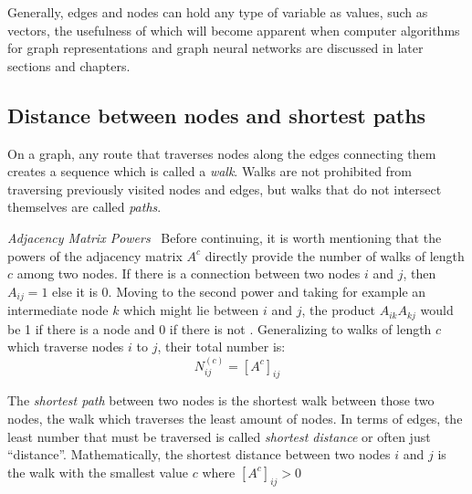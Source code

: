 Generally, edges and nodes can hold any type of variable as values,
such as vectors, the usefulness of which will become apparent when
computer algorithms for graph representations and graph neural
networks are discussed in later sections and chapters.


\subsection{Distance between nodes and shortest paths}

On a graph, any route that traverses nodes along the edges connecting them
creates a sequence which is called a \textit{walk}. Walks are not prohibited
from traversing previously visited nodes and edges, but walks that do not intersect
themselves are called \textit{paths}.

\begin{remark}
  \textit{Adjacency Matrix Powers}  ~Before continuing, it is worth
  mentioning that the powers of the adjacency matrix $A^c$ directly provide
  the number of walks of length $c$ among two nodes. If there is a connection
  between two nodes $i$ and $j$, then $A_{ij} = 1$ else it is 0. Moving
  to the second power and taking for example an intermediate node $k$
  which might lie between $i$ and $j$, the product $A_{ik}A_{kj}$ would be
  1 if there is a node and 0 if there is not \cite[p.~131]{book:Newman}.
  Generalizing to walks of length $c$ which traverse nodes $i$ to $j$, their
total number is:
  \begin{equation*}
    N^{(c)}_{ij} = [A^c]_{ij}
  \end{equation*}
\end{remark}

The \textit{shortest path} between two nodes is the shortest walk
between those two nodes, the walk which traverses the least amount of
nodes. In terms of edges, the least number that must be traversed
is called \textit{shortest distance}
or often just ``distance''. Mathematically, the shortest distance
between two nodes $i$ and $j$ is the walk with the smallest value $c$ where
$[A^c]_{ij} > 0$

